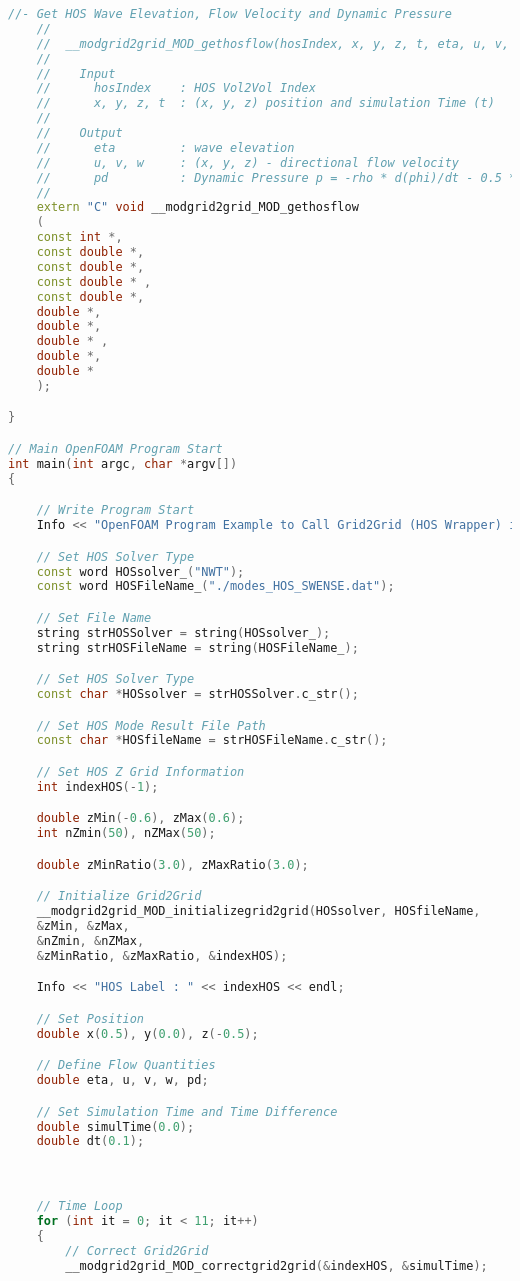 \begin{lstlisting}[language=c++]
	//- Get HOS Wave Elevation, Flow Velocity and Dynamic Pressure
	//
	//  __modgrid2grid_MOD_gethosflow(hosIndex, x, y, z, t, eta, u, v, w, pd)
	//
	//    Input
	//      hosIndex    : HOS Vol2Vol Index
	//      x, y, z, t  : (x, y, z) position and simulation Time (t)
	//
	//    Output
	//      eta         : wave elevation
	//      u, v, w     : (x, y, z) - directional flow velocity
	//      pd          : Dynamic Pressure p = -rho * d(phi)/dt - 0.5 * rho * |U * U|
	//
	extern "C" void __modgrid2grid_MOD_gethosflow
	(
	const int *,
	const double *,
	const double *,
	const double * ,
	const double *,
	double *,
	double *,
	double * ,
	double *,
	double *
	);

}

// Main OpenFOAM Program Start
int main(int argc, char *argv[])
{

	// Write Program Start
	Info << "OpenFOAM Program Example to Call Grid2Grid (HOS Wrapper) in OpenFOAM" << endl;

	// Set HOS Solver Type
	const word HOSsolver_("NWT");
	const word HOSFileName_("./modes_HOS_SWENSE.dat");

	// Set File Name
	string strHOSSolver = string(HOSsolver_);
	string strHOSFileName = string(HOSFileName_);

	// Set HOS Solver Type
	const char *HOSsolver = strHOSSolver.c_str();

	// Set HOS Mode Result File Path
	const char *HOSfileName = strHOSFileName.c_str();

	// Set HOS Z Grid Information
	int indexHOS(-1);

	double zMin(-0.6), zMax(0.6);
	int nZmin(50), nZMax(50);

	double zMinRatio(3.0), zMaxRatio(3.0);

	// Initialize Grid2Grid
	__modgrid2grid_MOD_initializegrid2grid(HOSsolver, HOSfileName,
	&zMin, &zMax,
	&nZmin, &nZMax,
	&zMinRatio, &zMaxRatio, &indexHOS);

	Info << "HOS Label : " << indexHOS << endl;

	// Set Position
	double x(0.5), y(0.0), z(-0.5);

	// Define Flow Quantities
	double eta, u, v, w, pd;

	// Set Simulation Time and Time Difference
	double simulTime(0.0);
	double dt(0.1);



	// Time Loop
	for (int it = 0; it < 11; it++)
	{
		// Correct Grid2Grid
		__modgrid2grid_MOD_correctgrid2grid(&indexHOS, &simulTime);


\end{lstlisting}
